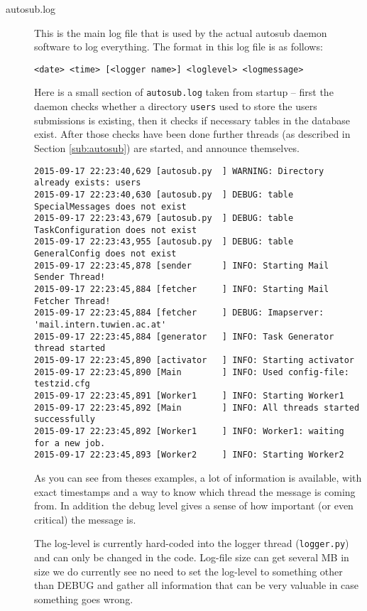 \begin{description}
\item [autosub.log] This is the main log file that is used by the actual autosub
daemon software to log everything. The format in this log file is as follows:

\begin{verbatim}
<date> <time> [<logger name>] <loglevel> <logmessage>
\end{verbatim}

Here is a small section of {\tt autosub.log} taken from startup -- first the daemon checks
whether a directory {\tt users} used to store the users submissions is existing, then
it checks if necessary tables in the database exist. After those checks have been
done further threads (as described in Section \ref{sub:autosub}) are started, and
announce themselves.

{\scriptsize
\begin{verbatim}
2015-09-17 22:23:40,629 [autosub.py  ] WARNING: Directory already exists: users
2015-09-17 22:23:40,630 [autosub.py  ] DEBUG: table SpecialMessages does not exist
2015-09-17 22:23:43,679 [autosub.py  ] DEBUG: table TaskConfiguration does not exist
2015-09-17 22:23:43,955 [autosub.py  ] DEBUG: table GeneralConfig does not exist
2015-09-17 22:23:45,878 [sender      ] INFO: Starting Mail Sender Thread!
2015-09-17 22:23:45,884 [fetcher     ] INFO: Starting Mail Fetcher Thread!
2015-09-17 22:23:45,884 [fetcher     ] DEBUG: Imapserver: 'mail.intern.tuwien.ac.at'
2015-09-17 22:23:45,884 [generator   ] INFO: Task Generator thread started
2015-09-17 22:23:45,890 [activator   ] INFO: Starting activator
2015-09-17 22:23:45,890 [Main        ] INFO: Used config-file: testzid.cfg
2015-09-17 22:23:45,891 [Worker1     ] INFO: Starting Worker1
2015-09-17 22:23:45,892 [Main        ] INFO: All threads started successfully
2015-09-17 22:23:45,892 [Worker1     ] INFO: Worker1: waiting for a new job.
2015-09-17 22:23:45,893 [Worker2     ] INFO: Starting Worker2
\end{verbatim}
}

As you can see from theses examples, a lot of information is available, with
exact timestamps and a way to know which thread the message is coming from.
In addition the debug level gives a sense of how important (or even critical)
the message is.

The log-level is currently hard-coded into the logger thread ({\tt logger.py}) and can only
be changed in the code. Log-file size can get several MB in size we do currently
see no need to set the log-level to something other than DEBUG and gather all information
that can be very valuable in case something goes wrong.


\end{description}
